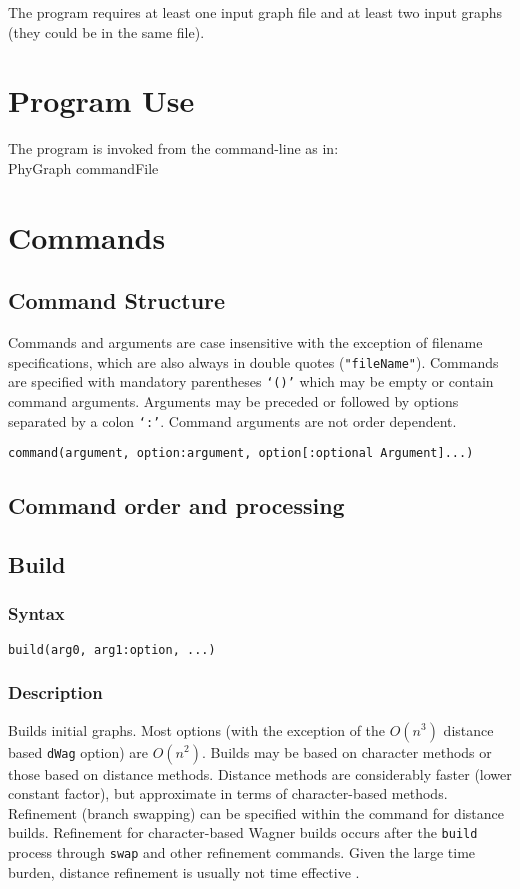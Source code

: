 \documentclass[11pt]{article}
\begin{document}
	

	
	The program requires at least one input graph file and at least two input graphs (they could be in the same file).

	
	\section{Program Use}
	The program is invoked from the command-line as in:\\
	PhyGraph commandFile\\
	
	\section{Commands}
		\subsection{Command Structure}
		Commands and arguments are case insensitive with the exception of filename specifications, which are also 
		always in double quotes (\texttt{"fileName"}).  Commands are specified with mandatory parentheses \texttt{`()'} which may be empty or
		contain command arguments. Arguments may be preceded or followed by options separated by a colon \texttt{`:'}.  Command arguments are not 
		order dependent.
		
		\bigskip
		\texttt{command(argument, option:argument, option[:optional Argument]...)}
		\subsection{Command order and processing}
	
	
	
	\subsection{Build}
		\subsubsection{Syntax}
		\texttt{build(arg0, arg1:option, ...)}
		\subsubsection{Description}
		Builds initial graphs.  Most options (with the exception of the $O(n^3)$ distance based \texttt{dWag} option)
		are $O(n^2)$.  Builds may be based on character methods or those based on distance methods.  Distance methods are considerably faster 
		(lower constant factor), but approximate in terms of character-based methods.  Refinement (branch swapping) can be specified
		within the command for distance builds.  Refinement for character-based Wagner builds occurs after the \texttt{build} process through \texttt{swap} and
		 other refinement commands.  Given the large time burden, distance refinement is usually not time effective \citep{Wheeler2021}.
\end{document}

